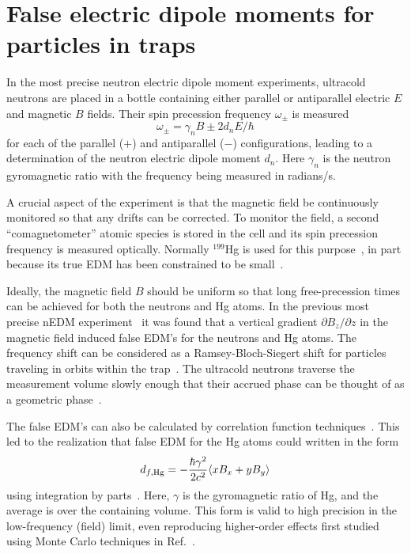 \documentclass[preprint,12pt]{elsarticle}
\begin{document}
\linenumbers

\section{False electric dipole moments for particles in traps}
\label{sec:intro}

In the most precise neutron electric dipole moment experiments,
ultracold neutrons are placed in a bottle containing either parallel
or antiparallel electric $E$ and magnetic $B$ fields.  Their spin
precession frequency $\omega_\pm$ is measured
\begin{equation}
\omega_\pm=\gamma_nB\pm 2d_nE/\hbar
\end{equation}
for each of the parallel ($+$) and antiparallel ($-$) configurations,
leading to a determination of the neutron electric dipole moment
$d_n$.  Here $\gamma_n$ is the neutron gyromagnetic ratio with the
frequency being measured in radians/s.

A crucial aspect of the experiment is that the magnetic field be
continuously monitored so that any drifts can be corrected.  To
monitor the field, a second ``comagnetometer'' atomic species is
stored in the cell and its spin precession frequency is measured
optically.  Normally $^{199}$Hg is used for this
purpose~\cite{bib:green,bib:bakernim,bib:hg-better}, in part because
its true EDM has been constrained to be
small~\cite{bib:griffith,bib:hgupdate}.

Ideally, the magnetic field $B$ should be uniform so that long
free-precession times can be achieved for both the neutrons and Hg
atoms.  In the previous most precise nEDM
experiment~\cite{bib:baker,bib:pendlebury} it was found that a
vertical gradient $\partial B_z/\partial z$ in the magnetic field
induced false EDM's for the neutrons and Hg atoms.  The frequency
shift can be considered as a Ramsey-Bloch-Siegert shift for particles
traveling in orbits within the trap~\cite{bib:gpe1,bib:gpe2}.  The
ultracold neutrons traverse the measurement volume slowly enough that
their accrued phase can be thought of as a geometric
phase~\cite{bib:gpe1}.

The false EDM's can also be calculated by correlation function
techniques~\cite{bib:gpe3,bib:gpe4}.  This led to the realization that
false EDM for the Hg atoms could written in the form
\begin{equation}
\label{eq:pignol}
  d_{f,\rm Hg}=-\frac{\hbar\gamma^{2}}{2c^{2}}\langle xB_x+yB_y\rangle
\end{equation}
using integration by parts~\cite{bib:pignol-roccia}.  Here, $\gamma$
is the gyromagnetic ratio of Hg, and the average is over the
containing volume. This form is valid to high precision in the
low-frequency (field) limit, even reproducing higher-order effects
first studied using Monte Carlo techniques in Ref.~\cite{bib:gpe2}.
\end{document}
